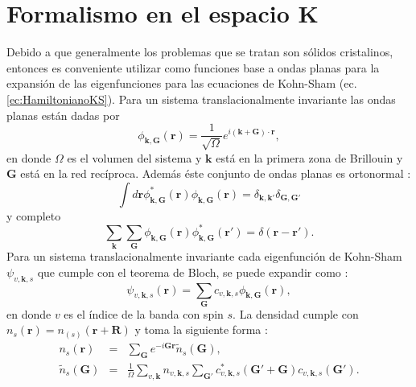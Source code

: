    \section{Formalismo  en el espacio K}\label{sec:solespacioK}
   Debido a que generalmente los problemas que se tratan son s\'olidos cristalinos, entonces es conveniente  utilizar como funciones base a ondas planas para la expansi\'on de las eigenfunciones para las ecuaciones de Kohn-Sham (ec. \ref{ec:HamiltonianoKS}). Para un sistema  translacionalmente invariante las ondas planas est\'an dadas por \cite{MB-2015}
   \begin{equation}
   \phi_{\pmb{k},\pmb{G}} (\pmb{r})= \frac{1}{\sqrt{\Omega}} e^{i (\pmb{k}+\pmb{G})\cdot \pmb{r}} \label{ec:ondaplana},
   \end{equation}
   en donde $\Omega$ es el volumen del sistema y $\pmb{k} $ est\'a en la primera zona de Brillouin y $\pmb{G}$ est\'a en la red rec\'iproca. Adem\'as \'este conjunto de ondas planas es ortonormal \cite{MB-2015}:
   \begin{equation}
   \int d \pmb{r} \phi_{\pmb{k},\pmb{G}}^* (\pmb{r}) \phi_{\pmb{k},\pmb{G}} (\pmb{r}) = \delta_{\pmb{k}, \pmb{k'}} \delta_{\pmb{G}, \pmb{G'}} \label{ec:PWorto}
   \end{equation} 
   y completo
   \begin{equation}
   \sum_{\pmb{k}} \sum_{\pmb{G}}  \phi_{\pmb{k},\pmb{G}} (\pmb{r}) \phi_{\pmb{k},\pmb{G}}^* (\pmb{r'}) = \delta (\pmb{r}- \pmb{r'}). \label{ec:PWComp}
   \end{equation}
   Para un sistema translacionalmente invariante cada eigenfunci\'on de Kohn-Sham $\psi_{v,\pmb{k},s }$ que cumple con el teorema de Bloch, se puede expandir como \cite{Martin-2004}:
   \begin{equation}
   \psi_{v,\pmb{k},s } (\pmb{r}) = \sum_{\pmb{G}} c_{v,\pmb{k},s } \phi_{\pmb{k},\pmb{G}} (\pmb{r}), \label{ec:basePW}
   \end{equation}
   en donde $v$ es el \'indice de la banda con  spin $s$. La densidad cumple con $n_s (\pmb{r}) = n_(s) (\pmb{r}+\pmb{R})$ y toma la siguiente forma \cite{MB-2015}:
   \begin{eqnarray}
   n_s(\pmb{r}) &=& \sum_{\pmb{G}} e^{-i \pmb{G} \pmb{r}} \tilde{n}_s (\pmb{G})  \label{ec:desnsiadK},\\
   \tilde{n}_s (\pmb{G}) &=& \frac{1}{\Omega} \sum_{v,\pmb{k}} n_{v,\pmb{k},s} \sum_{\pmb{G'}} c_{v,\pmb{k},s}^* (\pmb{G'}+\pmb{G}) c_{v,\pmb{k},s} (\pmb{G'}). \nonumber
   \end{eqnarray}
